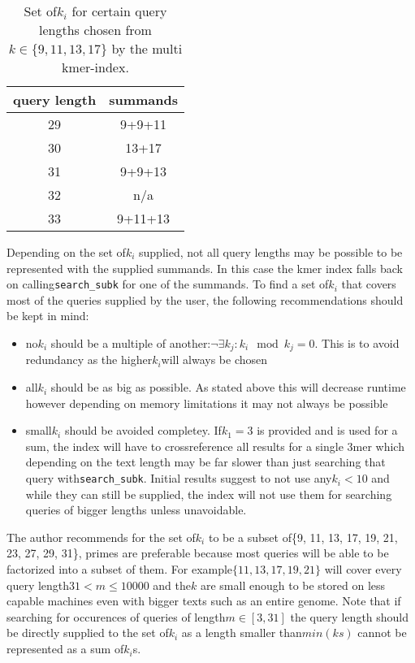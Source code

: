 \begin{table}[H]
\centering{}\caption{Set of$k_{i}$ for certain query lengths chosen from$k\in\{9,11,13,17\}$
by the multi kmer-index.}
\begin{tabular}{cc}
\toprule
query length & summands\tabularnewline
\midrule
\midrule
29 & 9+9+11\tabularnewline
\midrule
30 & 13+17\tabularnewline
\midrule
31 & 9+9+13\tabularnewline
\midrule
32 & n/a\tabularnewline
\midrule
33 & 9+11+13\tabularnewline
\bottomrule
\end{tabular}
\end{table}

Depending on the set of$k_{i}$ supplied, not all query lengths may
be possible to be represented with the supplied summands. In this
case the kmer index falls back on calling\lstinline{search_subk}
for one of the summands. To find a set of$k_{i}$ that covers most
of the queries supplied by the user, the following recommendations
should be kept in mind:
\begin{itemize}
\item no$k_{i}$ should be a multiple of another:$\lnot\exists k_{j}:k_{i}\mod k_{j}=0$.
This is to avoid redundancy as the higher$k_{i}$will always be chosen
\item all$k_{i}$ should be as big as possible. As stated above this will
decrease runtime however depending on memory limitations it may not
always be possible
\item small$k_{i}$ should be avoided completey. If$k_{1}=3$ is provided
and is used for a sum, the index will have to crossreference all results
for a single 3mer which depending on the text length may be far slower
than just searching that query with\lstinline{search_subk}. Initial
results suggest to not use any$k_{i}<10$ and while they can still
be supplied, the index will not use them for searching queries of
bigger lengths unless unavoidable.
\end{itemize}
The author recommends for the set of$k_{i}$ to be a subset of\{9,
11, 13, 17, 19, 21, 23, 27, 29, 31\}, primes are preferable because
most queries will be able to be factorized into a subset of them.
For example$\{11,13,17,19,21\}$ will cover every query length$31<m\leq10000$
and the$k$ are small enough to be stored on less capable machines
even with bigger texts such as an entire genome. Note that if searching
for occurences of queries of length$m\in[3,31]$ the query length
should be directly supplied to the set of$k_{i}$ as a length smaller
than$min(ks)$ cannot be represented as a sum of$k_{i}$s.

